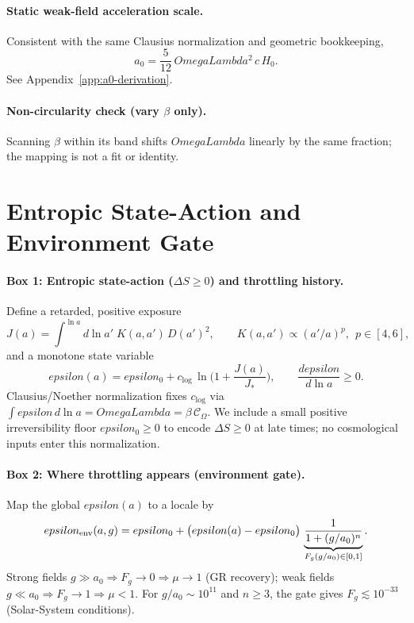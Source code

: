 \documentclass[aps,prd,onecolumn,superscriptaddress,nofootinbib]{revtex4-2}
\def\OmL{OmegaLambda}%
\def\eps{epsilon}%
\newcommand{\OmL}{\Omega_\Lambda}
\newcommand{\eps}{\varepsilon}
\begin{document}
\paragraph*{Static weak-field acceleration scale.}
Consistent with the same Clausius normalization and geometric bookkeeping,
\begin{equation}
a_0 = \frac{5}{12}\,\OmL^2\,c\,H_0.
\end{equation}
See Appendix~\ref{app:a0-derivation}.

\paragraph*{Non-circularity check (vary $\beta$ only).}
Scanning $\beta$ within its band shifts $\OmL$ linearly by the same fraction; the mapping is not a fit or identity.

\section{Entropic State-Action and Environment Gate}
\label{sec:state-action}

\paragraph*{Box 1: Entropic state-action ($\Delta S\ge 0$) and throttling history.}
Define a retarded, positive exposure
\begin{equation}
J(a)=\int^{\ln a}\!d\ln a'\;K(a,a')\,D(a')^2,\qquad K(a,a')\propto (a'/a)^p,\ \ p\in[4,6],
\end{equation}
and a monotone state variable
\begin{equation}
\eps(a)=\eps_0+c_{\log}\,\ln\!\Big(1+\frac{J(a)}{J_*}\Big),\qquad \frac{d\eps}{d\ln a}\ge 0.
\end{equation}
Clausius/Noether normalization fixes $c_{\log}$ via $\int \eps\,d\ln a=\OmL=\beta\,\mathcal C_\Omega$. We include a small positive irreversibility floor $\eps_0\ge 0$ to encode $\Delta S\ge 0$ at late times; no cosmological inputs enter this normalization.

\paragraph*{Box 2: Where throttling appears (environment gate).}
Map the global $\eps(a)$ to a locale by
\begin{equation}
\eps_{\rm env}(a,g)=\eps_0+\big(\eps(a)-\eps_0\big)\,\underbrace{\frac{1}{1+(g/a_0)^n}}_{F_g(g/a_0)\in[0,1]} .
\end{equation}
Strong fields $g\gg a_0\Rightarrow F_g\to 0\Rightarrow \mu\to 1$ (GR recovery); weak fields $g\ll a_0\Rightarrow F_g\to 1\Rightarrow \mu<1$. For $g/a_0\sim 10^{11}$ and $n\ge 3$, the gate gives $F_g\lesssim 10^{-33}$ (Solar-System conditions).
\end{document}
